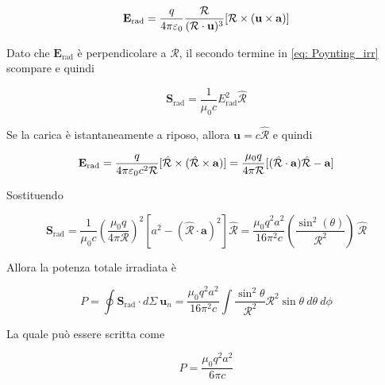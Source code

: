 \begin{equation}
    \mathbf{E}_{\text{rad}} = \frac{q}{4 \pi \varepsilon_0} \frac{\mathcal{R}}{(\mathbf{{\mathcal{R}}} \cdot \mathbf{u})^3} [\mathbf{\mathcal{R}} \times (\mathbf{u} \times \mathbf{a})]
\end{equation}

Dato che $\mathbf{E}_\text{rad}$ è perpendicolare a $\hat{\mathbf{\mathcal{R}}}$, il secondo termine in \eqref{eq: Poynting_irr} scompare e quindi 

\begin{equation}
    \mathbf{S}_{\text{rad}} = \frac{1}{\mu_0 c} E_{\text{rad}}^2 \hat{\mathbf{\mathcal{R}}}
\end{equation}

Se la carica è istantaneamente a riposo, allora $\mathbf{u} = c \hat{\mathbf{\mathcal{R}}}$ e quindi

\begin{equation}
    \mathbf{E}_{\text{rad}} = \frac{q}{4 \pi \varepsilon_0 c^2 \mathcal{R}} [\hat{\mathbf{\mathcal{R}}} \times (\hat{\mathbf{\mathcal{R}}} \times \mathbf{a})] = \frac{\mu_0 q}{4 \pi \mathcal{R}} [(\hat{\mathbf{\mathcal{R}}} \cdot \mathbf{a}) \hat{\mathbf{\mathcal{R}}} - \mathbf{a}]
\end{equation}

Sostituendo 

\begin{tcolorbox}[colback=yellow!10!white, colframe=orange!70!black, boxrule=0.8pt]
\begin{equation}
    \mathbf{S}_{\text{rad}} = \frac{1}{\mu_0 c} \left( \frac{\mu_0 q}{4 \pi \mathcal{R}} \right)^2 [a^2 - (\hat{\mathbf{\mathcal{R}}} \cdot \mathbf{a})^2] \hat{\mathbf{\mathcal{R}}} = \frac{\mu_0 q^2 a^2}{16 \pi^2 c} \left( \frac{\sin^2(\theta)}{\mathcal{R}^2} \right) \ \hat{\mathbf{\mathcal{R}}}
\end{equation}
\end{tcolorbox}

Allora la potenza totale irradiata è 

\begin{equation}
    P = \oint \mathbf{S}_{\text{rad}} \cdot d \Sigma \ \mathbf{u}_n = \frac{\mu_0 q^2 a^2}{16 \pi^2 c} \int \frac{\sin^2\theta}{\mathcal{R}^2} \mathcal{R}^2 \sin \theta \ d\theta \ d\phi
\end{equation}

La quale può essere scritta come 

\begin{tcolorbox}[colback=yellow!10!white, colframe=orange!70!black, boxrule=0.8pt]
\begin{equation} \label{eq: formula_Larmor}
    P = \frac{\mu_0 q^2 a^2}{6 \pi c}
\end{equation}\
\end{tcolorbox}

